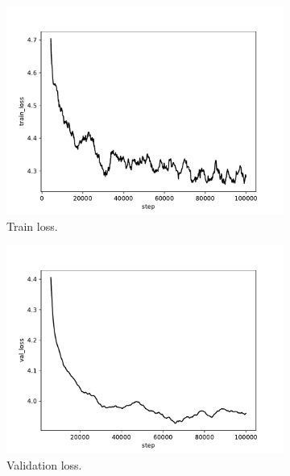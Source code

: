 \begin{figure}
    \centering
    \begin{subfigure}{.45\textwidth}
        \includegraphics[width=\textwidth]{graphics/work-artifacts/iterative/server/135/train_loss.pdf}
        \caption{Train loss.}
    \end{subfigure}
    \begin{subfigure}{.45\textwidth}
        \includegraphics[width=\textwidth]{graphics/work-artifacts/iterative/server/135/val_loss.pdf}
        \caption{Validation loss.}
    \end{subfigure}
    \begin{subfigure}{.45\textwidth}

\end{subfigure}
\end{figure}
